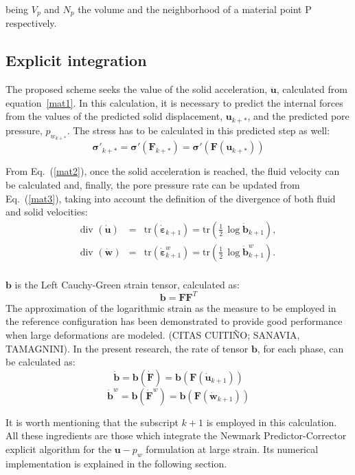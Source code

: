 \documentclass[twocolumn]{svjour3}          %
\begin{document}
  being $V_p$ and $N_p$ the volume and the neighborhood of a material point P respectively.
  
\subsection{Explicit integration}
\label{subsec:42}
The proposed scheme seeks the value of the solid acceleration, $\ddot{\boldsymbol{u}}$, calculated from equation~\eqref{mat1}. In this calculation, it is necessary to predict the internal forces from the values of the predicted solid displacement, $\boldsymbol{u}_{k+*}$, and the predicted pore pressure, $p_{w_{k+*}}$. The stress has to be calculated in this predicted step as well:
$$
\boldsymbol{\sigma'}_{k+*}=\boldsymbol{\sigma'}(\boldsymbol{F}_{k+*})=\boldsymbol{\sigma'}(\boldsymbol{F}(\boldsymbol{u}_{k+*}))
$$

From Eq.~(\ref{mat2}), once the solid acceleration is reached, the fluid velocity can be calculated and, finally, the pore pressure rate can be updated from Eq.~(\ref{mat3}), taking into account the definition of the divergence of both fluid and solid velocities: 
\begin{eqnarray}
\mbox{div }(\dot{\boldsymbol{u}}) &=& \mbox{tr}(\boldsymbol{\dot{\varepsilon}}_{k+1})=\mbox{tr} \left (\frac{1}{2}\,\log\dot{\mathbf{b}}_{k+1} \right), \\
\mbox{div }(\dot{\boldsymbol{w}}) &=& \mbox{tr} (\boldsymbol{\dot{\varepsilon}}^w_{k+1})=\mbox{tr} \left(\frac{1}{2}\,\log\dot{\mathbf{b}}^w_{k+1} \right). \\
\end{eqnarray}

$\mathbf{b}$ is the Left Cauchy-Green strain tensor, calculated as:
 $$\mathbf{b}=\mathbf{F}\mathbf{F}^T$$
 The approximation of the logarithmic strain as the measure to be employed in the reference configuration has been demonstrated to provide good performance when large deformations are modeled. (CITAS CUITIÑO; SANAVIA, TAMAGNINI). In the present research, the rate of tensor $\mathbf{b}$, for each phase, can be calculated as:
 $$
 \dot{\mathbf{b}}=\mathbf{b}(\dot{\mathbf{F}})=\mathbf{b}(\mathbf{F}(\dot{\boldsymbol{u}}_{k+1}))
 $$
  $$
 \dot{\mathbf{b}}^w=\mathbf{b}(\dot{\mathbf{F}}^w)=\mathbf{b}(\mathbf{F}(\dot{\boldsymbol{w}}_{k+1}))
 $$
 
 It is worth mentioning that the subscript $k+1$ is employed in this calculation. All these ingredients are those which integrate the Newmark Predictor-Corrector explicit algorithm for the $\boldsymbol{u}-p_w$ formulation at large strain. Its numerical implementation is explained in the following section.
\end{document}
